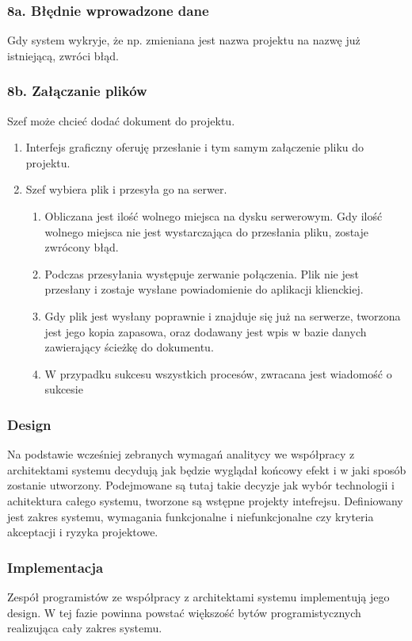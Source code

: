 \documentclass{article}
\begin{document}
\begin{tcolorbox}
    \subsubsection*{8a. Błędnie wprowadzone dane}
    Gdy system wykryje, że np. zmieniana jest nazwa projektu na nazwę już istniejącą, zwróci błąd.

    \subsubsection*{8b. Załączanie plików}
    Szef może chcieć dodać dokument do projektu.
    \begin{enumerate}
        \item Interfejs graficzny oferuję przesłanie i tym samym załączenie pliku do projektu.
        \item Szef wybiera plik i przesyła go na serwer.
              \begin{enumerate}
                  \item Obliczana jest ilość wolnego miejsca na dysku serwerowym. Gdy ilość wolnego miejsca nie jest wystarczająca do przesłania pliku, zostaje zwrócony błąd.
                  \item Podczas przesyłania występuje zerwanie połączenia. Plik nie jest przesłany i zostaje wysłane powiadomienie do aplikacji klienckiej.
                  \item Gdy plik jest wysłany poprawnie i znajduje się już na serwerze, tworzona jest jego kopia zapasowa, oraz dodawany jest wpis w bazie danych zawierający ścieżkę do dokumentu.
                  \item W przypadku sukcesu wszystkich procesów, zwracana jest wiadomość o sukcesie
              \end{enumerate}
    \end{enumerate}
\end{tcolorbox}
\subsubsection*{Design}
Na podstawie wcześniej zebranych wymagań analitycy we współpracy z architektami systemu decydują jak będzie wyglądał końcowy efekt i w jaki sposób zostanie utworzony. Podejmowane są tutaj takie decyzje jak wybór technologii i achitektura całego systemu, tworzone są wstępne projekty intefrejsu. Definiowany jest zakres systemu, wymagania funkcjonalne i niefunkcjonalne czy kryteria akceptacji i ryzyka projektowe.

\subsubsection*{Implementacja}
Zespół programistów ze współpracy z architektami systemu implementują jego design. W tej fazie powinna powstać większość bytów programistycznych realizująca cały zakres systemu.
\end{document}
